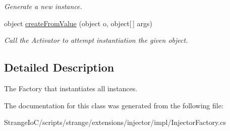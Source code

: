 \begin{DoxyCompactItemize}
\begin{DoxyCompactList}\small\item\em Generate a new instance. \end{DoxyCompactList}\item 
\hypertarget{classstrange_1_1extensions_1_1injector_1_1impl_1_1_injector_factory_a91f6e1072012692e9e43696b6d7ce41d}{object \hyperlink{classstrange_1_1extensions_1_1injector_1_1impl_1_1_injector_factory_a91f6e1072012692e9e43696b6d7ce41d}{create\-From\-Value} (object o, object\mbox{[}$\,$\mbox{]} args)}\label{classstrange_1_1extensions_1_1injector_1_1impl_1_1_injector_factory_a91f6e1072012692e9e43696b6d7ce41d}

\begin{DoxyCompactList}\small\item\em Call the Activator to attempt instantiation the given object. \end{DoxyCompactList}\end{DoxyCompactItemize}


\subsection{Detailed Description}
The Factory that instantiates all instances. 

The documentation for this class was generated from the following file\-:\begin{DoxyCompactItemize}
\item 
Strange\-Io\-C/scripts/strange/extensions/injector/impl/Injector\-Factory.\-cs\end{DoxyCompactItemize}
